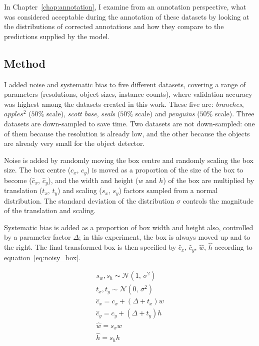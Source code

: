 In Chapter~\ref{chap:annotation}, I examine from an annotation perspective, what was considered acceptable during the annotation of these datasets by looking at the distributions of corrected annotations and how they compare to the predictions supplied by the model. 

\subsection{Method}

I added noise and systematic bias to five different datasets, covering a range of parameters (resolutions, object sizes, instance counts), where validation accuracy was highest among the datasets created in this work. These five are: \emph{branches}, $apples^2$ ($50\%$ scale), \emph{scott base}, \emph{seals} ($50\%$ scale) and \emph{penguins} ($50\%$ scale). Three datasets are down-sampled to save time. Two datasets are not down-sampled: one of them because the resolution is already low, and the other because the objects are already very small for the object detector.

Noise is added by randomly moving the box centre and randomly scaling the box size. The box centre ($c_x$, $c_y$) is moved as a proportion of the size of the box to become ($\hat{c}_x$, $\hat{c}_y$), and the width and height ($w$ and $h$) of the box are multiplied by translation ($t_x$, $t_y$) and scaling ($s_x$, $s_y$) factors sampled from a normal distribution. The standard deviation of the distribution $\sigma$ controls the magnitude of the translation and scaling. 

Systematic bias is added as a proportion of box width and height also, controlled by a parameter factor $\Delta$; in this experiment, the box is always moved up and to the right. The final transformed box is then specified by $\hat{c}_x$, $\hat{c}_y$, $\hat{w}$, $\hat{h}$ according to equation~\ref{eq:noisy_box}. 

\begin{equation}
\begin{split}
    s_w, s_h \sim \mathcal{N}(1,\,\sigma^{2})\\
    t_x, t_y \sim \mathcal{N}(0,\,\sigma^{2})\\
    \hat{c}_x = c_x + (\Delta + t_x) w\\
    \hat{c}_y = c_y + (\Delta + t_y) h\\
    \hat{w} = s_x w\\
    \hat{h} = s_h h\\
\end{split}
\label{eq:noisy_box}
\end{equation}


